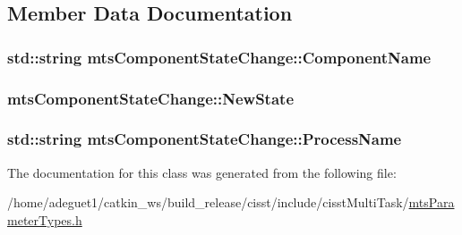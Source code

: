 \subsection{Member Data Documentation}
\hypertarget{classmts_component_state_change_afe02d7dd968c69a631917efb66c3f5a9}{
\subsubsection[{Component\-Name}]{\setlength{\rightskip}{0pt plus 5cm}std\-::string mts\-Component\-State\-Change\-::\-Component\-Name}}\label{classmts_component_state_change_afe02d7dd968c69a631917efb66c3f5a9}
\hypertarget{classmts_component_state_change_ae3abdb4b20508af94c78c01168d1cf0e}{
\subsubsection[{New\-State}]{ mts\-Component\-State\-Change\-::\-New\-State}}\label{classmts_component_state_change_ae3abdb4b20508af94c78c01168d1cf0e}
\hypertarget{classmts_component_state_change_a47784c0fa820ca6789fc02049eb6f795}{
\subsubsection[{Process\-Name}]{\setlength{\rightskip}{0pt plus 5cm}std\-::string mts\-Component\-State\-Change\-::\-Process\-Name}}\label{classmts_component_state_change_a47784c0fa820ca6789fc02049eb6f795}


The documentation for this class was generated from the following file\-:\begin{DoxyCompactItemize}
\item 
/home/adeguet1/catkin\-\_\-ws/build\-\_\-release/cisst/include/cisst\-Multi\-Task/\hyperlink{mts_parameter_types_8h}{mts\-Parameter\-Types.\-h}\end{DoxyCompactItemize}
